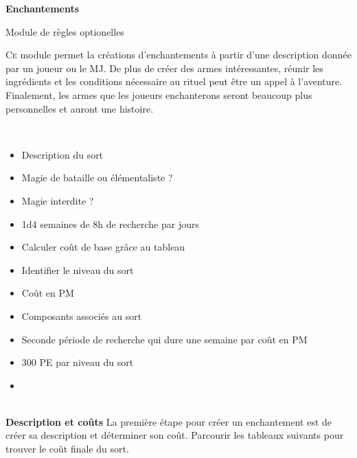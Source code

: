 \documentclass[11pt]{article} %
\newcommand{\enluminure}[2]{\lettrine[lines=3]{\small \initfamily #1}{#2}}
\newcommand{\myjump}[1][1]{\mbox{}\\[#1cm]}
\begin{document}
\pagestyle{empty}

\begin{center}
    \textbf{Enchantements}

    Module de règles optionelles
\end{center}

\enluminure{C}{e} module permet la créations d'enchantements à partir d'une description donnée par un joueur ou le MJ. De plus de créer des armes intéressantes, réunir les ingrédients et les conditions nécessaire au rituel peut être un appel à l'aventure. Finalement, les armes que les joueurs enchanterons seront beaucoup plus personnelles et auront une histoire.

\myjump
\begin{itemize}
    \item Description du sort
    \item Magie de bataille ou élémentaliste ?
    \item Magie interdite ?
    \item 1d4 semaines de 8h de recherche par jours
    \item Calculer coût de base grâce au tableau
    \item Identifier le niveau du sort
    \item Coût en PM
    \item Composants associés au sort
    \item Seconde période de recherche qui dure une semaine par coût en PM
    \item 300 PE par niveau du sort
    \item


\end{itemize}


\myjump[0]
\textbf{\huge Description et coûts}\newline
La première étape pour créer un enchantement est de créer sa description et déterminer son coût. Parcourir les tableaux suivants pour trouver le coût finale du sort.\newline
\end{document}

